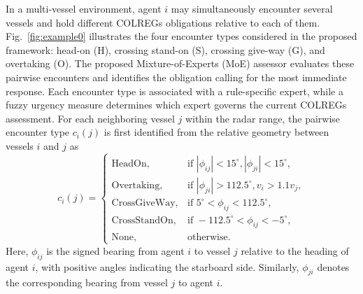 \documentclass[final,5p,times,twocolumn]{elsarticle}
\begin{document}
{\color{violet}
In a multi-vessel environment, agent $i$ may simultaneously encounter
several vessels and hold different COLREGs obligations relative to each
of them. Fig.~\ref{fig:example0} illustrates the four encounter types
considered in the proposed framework: head-on (H), crossing stand-on
(S), crossing give-way (G), and overtaking (O). The proposed
Mixture-of-Experts (MoE) assessor evaluates these pairwise encounters
and identifies the obligation calling for the most immediate response.
Each encounter type is associated with a rule-specific expert, while a
fuzzy urgency measure determines which expert governs the current
COLREGs assessment.
For each neighboring vessel $j$ within the radar range, the pairwise
encounter type $c_i(j)$ is first identified from the relative geometry
between vessels $i$ and $j$ as
\begin{equation}
c_i(j)
=\begin{cases}
\mathrm{HeadOn},
&\text{if } |\phi_{ij}|<15^\circ,|\phi_{ji}|<15^\circ,
\\[4pt]
\mathrm{Overtaking},
&\text{if } |\phi_{ji}|>112.5^\circ,v_i>1.1v_j,
\\[4pt]
\mathrm{CrossGiveWay},
&\text{if } 5^\circ<\phi_{ij}<112.5^\circ,\\[4pt]
\mathrm{CrossStandOn},
&\text{if } -112.5^\circ<\phi_{ij}<-5^\circ,\\[4pt]
\mathrm{None},
&\text{otherwise}.
\end{cases}
\label{eq:encounter_type}
\end{equation}
Here, $\phi_{ij}$ is the signed bearing from agent $i$ to vessel $j$
relative to the heading of agent $i$, with positive angles indicating
the starboard side. Similarly, $\phi_{ji}$ denotes the corresponding
bearing from vessel $j$ to agent $i$.

}
\end{document}
